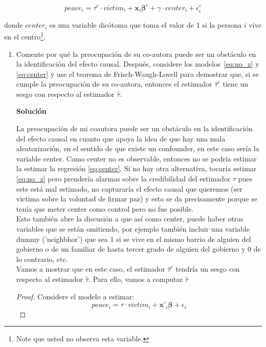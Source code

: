 \documentclass[a4paper, answers, addpoints, 11pt]{exam}
\newenvironment{solucion}{%
  \begin{mdframed}[
    backgroundcolor=blue!5,    %
    linecolor=blue!50,          %
    linewidth=2pt,              %
    leftmargin=10pt,            %
    rightmargin=10pt,           %
    topline=true,              %
    bottomline=true,            %
    roundcorner=10pt,           %
    innerleftmargin=10pt,       %
    innerrightmargin=10pt,      %
    innerbottommargin=10pt,     %
    innertopmargin=10pt         %
  ]%
  \begin{tcolorbox}[colframe=blue!50!black, colback=blue!50, coltitle=white, sharp corners=all, boxrule=1mm, width=\textwidth, halign=left, valign=center, top=0mm, bottom=0mm, left=0mm, right=0mm] \textbf{Solución} \end{tcolorbox} }{\end{mdframed}}
\begin{document}
    \begin{equation}\label{eq:center}
        peace_i = \tau^{c} \cdot victim_i + \textbf{x}_i\boldsymbol\beta^{c} + \gamma \cdot center_i + \epsilon^{c}_i
    \end{equation}

    donde $center_i$ es una variable dicótoma que toma el valor de 1 si la persona $i$ vive en el centro\footnote{Note que usted no observa esta variable.}. 

\begin{enumerate} [resume]
    \item Comente por qué la preocupación de su co-autora puede ser un obstáculo en la identificación del efecto causal. Después, considere los modelos~\eqref{eq:no_z} y \eqref{eq:center} y use el teorema de Frisch-Waugh-Lovell para demostrar que, si se cumple la preocupación de su co-autora, entonces el estimador $\hat\tau^c$ tiene un sesgo con respecto al estimador $\hat\tau$.

  \begin{solucion}
        
        La preocupación de mi coautora puede ser un obstáculo en la identificación del efecto causal en cuanto que apoya la idea de que hay una mala aleatorización, en el sentido de que existe un confounder, en este caso sería la variable center. Como center no es observable, entonces no se podría estimar la  estimar la regresión \eqref{eq:center}. Si no hay otra alternativa, tocaría estimar \ref{eq:no_z} pero prendería alarmas sobre la credibilidad del estimador $\tau$ pues este está mal estimado, no capturaría el efecto causal que queremos (ser victima sobre la voluntad de firmar paz) y esto se da precisamente porque se tenía que meter center como control pero no fue posible. \\
        Esto también abre la discusión a que así como center, puede haber otras variables que se están omitiendo, por ejemplo también incluir una variable dummy ('neighbhor') que sea 1 si se vive en el mismo barrio de alguien del gobierno o de un familiar de hasta tercer grado de alguien del gobierno y 0 de lo contrario, etc.\\
        
    Vamos a mostrar que en este caso, el estimador  $\hat\tau^c$ tendría un sesgo con respecto al estimador $\hat\tau$. Para ello, vamos a computar $\hat\tau$
    \begin{proof}
Considere el modelo a estimar:
\begin{equation*} 
    peace_i = \tau \cdot victim_i + \textbf{x}'_i\boldsymbol\beta + \epsilon_i
\end{equation*}


\end{proof}
\end{solucion}
\end{enumerate}
\end{document}
